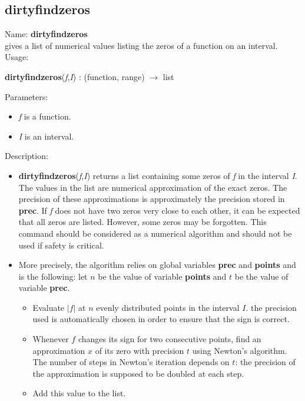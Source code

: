 \subsection{dirtyfindzeros}
\label{labdirtyfindzeros}
\noindent Name: \textbf{dirtyfindzeros}\\
gives a list of numerical values listing the zeros of a function on an interval.\\
\noindent Usage: 
\begin{center}
\textbf{dirtyfindzeros}(\emph{f},\emph{I}) : (\textsf{function}, \textsf{range}) $\rightarrow$ \textsf{list}
\end{center}
Parameters: 
\begin{itemize}
\item \emph{f} is a function.
\item \emph{I} is an interval.
\end{itemize}
\noindent Description: \begin{itemize}

\item \textbf{dirtyfindzeros}(\emph{f},\emph{I}) returns a list containing some zeros of \emph{f} in the
   interval \emph{I}. The values in the list are numerical approximation of the exact
   zeros. The precision of these approximations is approximately the precision
   stored in \textbf{prec}. If \emph{f} does not have two zeros very close to each other, it 
   can be expected that all zeros are listed. However, some zeros may be
   forgotten. This command should be considered as a numerical algorithm and
   should not be used if safety is critical.

\item More precisely, the algorithm relies on global variables \textbf{prec} and \textbf{points} and
   is the following: let $n$ be the value of variable \textbf{points} and $t$ be the value
   of variable \textbf{prec}.
   \begin{itemize}
   \item Evaluate $|f|$ at $n$ evenly distributed points in the interval $I$.
     the precision used is automatically chosen in order to ensure that the sign
     is correct.
   \item Whenever $f$ changes its sign for two consecutive points,
     find an approximation $x$ of its zero with precision $t$ using
     Newton's algorithm. The number of steps in Newton's iteration depends on $t$:
     the precision of the approximation is supposed to be doubled at each step.
   \item Add this value to the list.
   \end{itemize}
\end{itemize}
